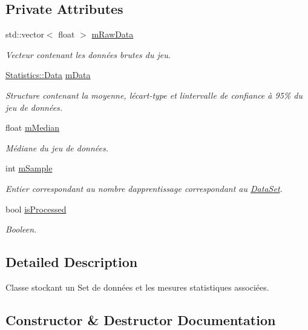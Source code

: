\subsection*{Private Attributes}
\begin{DoxyCompactItemize}
\item 
std\+::vector$<$ float $>$ \hyperlink{classDataSet_a578c8ddd82c2e24468d88bfd4cbfc917}{m\+Raw\+Data}
\begin{DoxyCompactList}\small\item\em Vecteur contenant les données brutes du jeu. \end{DoxyCompactList}\item 
\hyperlink{structStatistics_1_1Data}{Statistics\+::\+Data} \hyperlink{classDataSet_a043f1a249aa8752a8cc3115fbee61e2e}{m\+Data}
\begin{DoxyCompactList}\small\item\em Structure contenant la moyenne, l\textquotesingle{}écart-\/type et l\textquotesingle{}intervalle de confiance à 95\% du jeu de données. \end{DoxyCompactList}\item 
float \hyperlink{classDataSet_acf52ca5fc1f11ea8f027c7b7ad1e0d34}{m\+Median}
\begin{DoxyCompactList}\small\item\em Médiane du jeu de données. \end{DoxyCompactList}\item 
int \hyperlink{classDataSet_a0a2e6525fdc36753382e0546e26198df}{m\+Sample}
\begin{DoxyCompactList}\small\item\em Entier correspondant au nombre d\textquotesingle{}apprentissage correspondant au \hyperlink{classDataSet}{Data\+Set}. \end{DoxyCompactList}\item 
bool \hyperlink{classDataSet_acc6a6082256c926e1ad8bfa713966441}{is\+Processed}
\begin{DoxyCompactList}\small\item\em Booleen. \end{DoxyCompactList}\end{DoxyCompactItemize}


\subsection{Detailed Description}
Classe stockant un Set de données et les mesures statistiques associées. 

\subsection{Constructor \& Destructor Documentation}
\mbox{\label{classDataSet_ab45c95dc19f12a9217c0f3da7ac92b6a}} 
